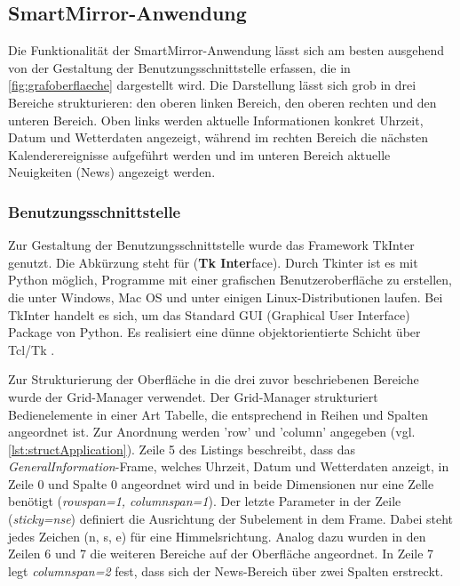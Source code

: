 \subsection{SmartMirror-Anwendung}
\label{smartMirror}
Die Funktionalität der SmartMirror-Anwendung lässt sich am besten ausgehend von der Gestaltung der Benutzungsschnittstelle erfassen, die in \autoref{fig:grafoberflaeche} dargestellt wird. Die Darstellung lässt sich grob in drei Bereiche strukturieren: den oberen linken Bereich, den oberen rechten und den unteren Bereich. Oben links werden aktuelle Informationen konkret Uhrzeit, Datum und Wetterdaten angezeigt, während im rechten Bereich die nächsten Kalenderereignisse aufgeführt werden und im unteren Bereich aktuelle Neuigkeiten (News) angezeigt werden. 

\subsubsection*{Benutzungsschnittstelle}

Zur Gestaltung der Benutzungsschnittstelle wurde das Framework TkInter genutzt. Die Abkürzung steht für (\textbf{Tk Inter}face).  Durch Tkinter ist es mit Python möglich, Programme mit einer grafischen Benutzeroberfläche zu erstellen, die unter Windows, Mac OS und unter einigen Linux-Distributionen laufen. Bei TkInter handelt es sich, um das Standard GUI (Graphical User Interface) Package von Python. Es realisiert eine dünne objektorientierte Schicht über Tcl/Tk \cite{scholl2014tcl}. 

Zur Strukturierung der Oberfläche in die drei zuvor beschriebenen Bereiche wurde der Grid-Manager verwendet. Der Grid-Manager strukturiert Bedienelemente in einer Art Tabelle, die entsprechend in Reihen und Spalten angeordnet ist. Zur Anordnung werden 'row' und 'column' angegeben (vgl. \autoref{lst:structApplication}). Zeile 5 des Listings beschreibt, dass das \textit{GeneralInformation}-Frame, welches Uhrzeit, Datum und Wetterdaten anzeigt, in Zeile 0 und Spalte 0 angeordnet wird und in beide Dimensionen nur eine Zelle benötigt (\textit{rowspan=1, columnspan=1}). Der letzte Parameter in der Zeile (\textit{sticky=\grqq nse\grqq}) definiert die Ausrichtung der Subelement in dem Frame. Dabei steht jedes Zeichen (n, s, e) für eine Himmelsrichtung. Analog dazu wurden in den Zeilen 6 und 7 die weiteren Bereiche auf der Oberfläche angeordnet. In Zeile 7 legt \textit{\textit{columnspan=2}} fest, dass sich der News-Bereich über zwei Spalten erstreckt.

\begin{minipage}{\textwidth}
	
\end{minipage}

